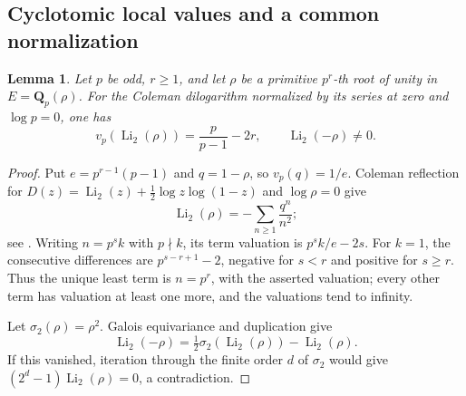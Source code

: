 \documentclass[11pt,a4paper]{article}
\newtheorem{lemma}[theorem]{Lemma}
\theoremstyle{remark}
\newcommand{\Q}{\mathbf Q}
\begin{document}
\subsection{Cyclotomic local values and a common normalization}
\label{sec:cyclotomicnormalization}


\begin{lemma}\label{lem:cyclotomicdilognonzero}
Let $p$ be odd, $r\geq1$, and let $\rho$ be a primitive $p^r$-th
root of unity in $E=\Q_p(\rho)$. For the Coleman dilogarithm
normalized by its series at zero and $\log p=0$, one has
\[
 v_p(\operatorname{Li}_2(\rho))
 =\frac p{p-1}-2r,\qquad
 \operatorname{Li}_2(-\rho)\ne0.
\]
\end{lemma}
\begin{proof}
Put $e=p^{r-1}(p-1)$ and $q=1-\rho$, so $v_p(q)=1/e$.
Coleman reflection for
$D(z)=\operatorname{Li}_2(z)+\frac12\log z\log(1-z)$
and $\log\rho=0$ give
\[
 \operatorname{Li}_2(\rho)
 =-\sum_{n\geq1}\frac{q^n}{n^2};
\]
see \cite[p.~377]{BesserDeJeuCurves}.
Writing $n=p^sk$ with $p\nmid k$, its term valuation is
$p^sk/e-2s$. For $k=1$, the consecutive differences are
$p^{s-r+1}-2$, negative for $s<r$ and positive for $s\geq r$.
Thus the unique least term is $n=p^r$, with the asserted
valuation; every other term has valuation at least one more,
and the valuations tend to infinity.

Let $\sigma_2(\rho)=\rho^2$. Galois equivariance and duplication
\cite[Remark~2.3 and equation~(2.4)]{BesserDeJeu} give
\[
 \operatorname{Li}_2(-\rho)
 =\tfrac12\sigma_2(\operatorname{Li}_2(\rho))
       -\operatorname{Li}_2(\rho).
\]
If this vanished, iteration through the finite order $d$ of
$\sigma_2$ would give
$(2^d-1)\operatorname{Li}_2(\rho)=0$, a contradiction.
\end{proof}
\end{document}
